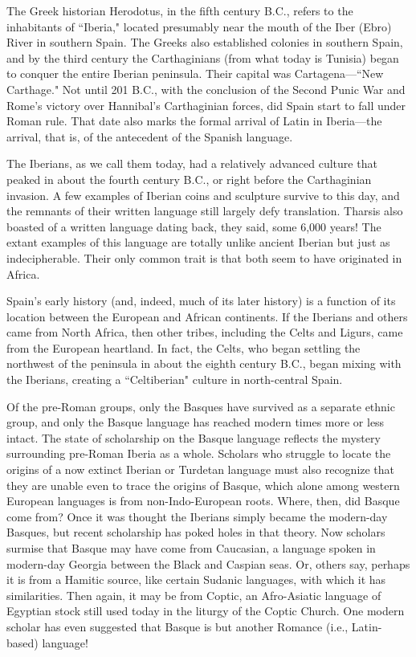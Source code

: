 The Greek historian Herodotus, in the fifth century B.C., refers
to the inhabitants of ``Iberia," located presumably near the mouth of
the Iber (Ebro) River in southern Spain. The Greeks also established
colonies in southern Spain, and by the third century the Carthaginians (from what today is Tunisia) began to conquer the entire Iberian
peninsula. Their capital was Cartagena---``New Carthage." Not until
201 B.C., with the conclusion of the Second Punic War and Rome's victory over Hannibal's Carthaginian forces, did Spain start to fall under
Roman rule. That date also marks the formal arrival of Latin in Iberia---the arrival, that is, of the antecedent of the Spanish language.

The Iberians, as we call them today, had a relatively advanced
culture that peaked in about the fourth century B.C., or right before
the Carthaginian invasion. A few examples of Iberian coins and sculpture survive to this day, and the remnants of their written language
still largely defy translation. Tharsis also boasted of a written language dating back, they said, some 6,000 years! The extant examples
of this language are totally unlike ancient Iberian but just as indecipherable. Their only common trait is that both seem to have originated in Africa.

Spain's early history (and, indeed, much of its later history) is a
function of its location between the European and African continents.
If the Iberians and others came from North Africa, then other tribes,
including the Celts and Ligurs, came from the European heartland. In
fact, the Celts, who began settling the northwest of the peninsula in
about the eighth century B.C., began mixing with the Iberians, creating
a ``Celtiberian" culture in north-central Spain.

Of the pre-Roman groups, only the Basques have survived
as a separate ethnic group, and only the Basque language has reached
modern times more or less intact. The state of scholarship on the
Basque language reflects the mystery surrounding pre-Roman Iberia
as a whole. Scholars who struggle to locate the origins of a now extinct
Iberian or Turdetan language must also recognize that they are unable
even to trace the origins of Basque, which alone among
western European languages is from non-Indo-European roots. Where, then, did
Basque come from? Once it was thought the Iberians simply became
the modern-day Basques, but recent scholarship has poked holes in
that theory. Now scholars surmise that Basque may have come from
Caucasian, a language spoken in modern-day Georgia between the
Black and Caspian seas. Or, others say, perhaps it is from a Hamitic
source, like certain Sudanic languages, with which it has similarities.
Then again, it may be from Coptic, an Afro-Asiatic language of Egyptian stock still used today in the liturgy of the Coptic Church. One
modern scholar has even suggested that Basque is but another Romance (i.e., Latin-based) language!

